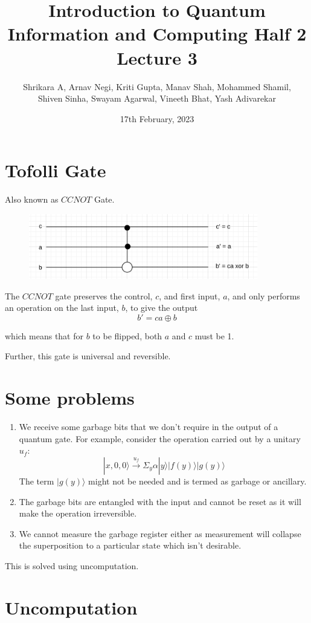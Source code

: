 \documentclass{article}
\title{Introduction to Quantum Information and Computing Half 2 Lecture 3}
\author{Shrikara A, Arnav Negi, Kriti Gupta, Manav Shah, Mohammed Shamil,\\ Shiven Sinha, Swayam Agarwal, Vineeth Bhat, Yash Adivarekar}
\date{17th February, 2023}
\begin{document}
\maketitle

\section{Tofolli Gate}

Also known as $CCNOT$ Gate.

\begin{figure}[htp]
    \centering
    \includegraphics[width=10cm]{tofolli.png}
\end{figure}

The $CCNOT$ gate preserves the control, $c$, and first input, $a$, and only performs an operation on the last input, $b$, to give the output $$b'=ca \oplus b$$

which means that for $b$ to be flipped, both $a$ and $c$ must be 1.

Further, this gate is universal and reversible.

\section{Some problems}

\begin{enumerate}
    \item We receive some garbage bits that we don't require in the output of a quantum gate. For example, consider the operation carried out by a unitary $u_f$:
    $$|x,0,0\rangle \xrightarrow[]{u_f} \Sigma_y \alpha |y\rangle |f(y)\rangle |g(y)\rangle $$
    The term $|g(y)\rangle$ might not be needed and is termed as garbage or ancillary.
    \item The garbage bits are entangled with the input and cannot be reset as it will make the operation irreversible.
    \item We cannot measure the garbage register either as measurement will collapse the superposition to a particular state which isn't desirable.
\end{enumerate}
This is solved using uncomputation.

\section {Uncomputation}
\end{document}
